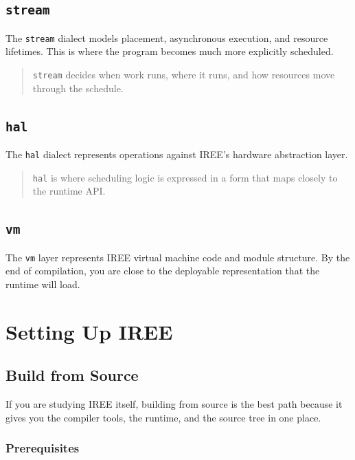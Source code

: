 \documentclass[11pt,a4paper]{article}
\begin{document}
\subsection{\texttt{stream}}

The \texttt{stream} dialect models placement, asynchronous execution, and resource lifetimes. This is where the program becomes much more explicitly scheduled.

\begin{quote}
\texttt{stream} decides when work runs, where it runs, and how resources move through the schedule.
\end{quote}

\subsection{\texttt{hal}}

The \texttt{hal} dialect represents operations against IREE's hardware abstraction layer.

\begin{quote}
\texttt{hal} is where scheduling logic is expressed in a form that maps closely to the runtime API.
\end{quote}

\subsection{\texttt{vm}}

The \texttt{vm} layer represents IREE virtual machine code and module structure. By the end of compilation, you are close to the deployable representation that the runtime will load.

\section{Setting Up IREE}

\subsection{Build from Source}

If you are studying IREE itself, building from source is the best path because it gives you the compiler tools, the runtime, and the source tree in one place.

\subsubsection{Prerequisites}
\end{document}

